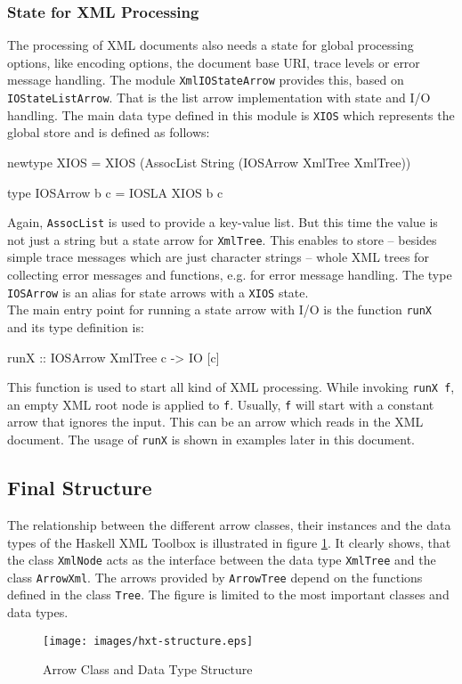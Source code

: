 \documentclass[11pt,a4paper,headsepline, bibtotoc]{scrreprt}
\begin{document}
\subsubsection{State for XML Processing}\label{xmlstate}
The processing of XML documents also needs a state for global processing options, like encoding options, the document base URI, trace levels or error message handling. The module \texttt{XmlIO\-StateArrow} provides this, based on \texttt{IOStateListArrow}. That is the list arrow implementation with state and I/O handling. The main data type defined in this module is \texttt{XIOS} which represents the global store and is defined as follows:
\begin{code}
newtype XIOS 
    = XIOS (AssocList String (IOSArrow XmlTree XmlTree))

type IOSArrow b c = IOSLA XIOS b c
\end{code}
Again, \texttt{AssocList} is used to provide a key-value list. But this time the value is not just a string but a state arrow for \texttt{XmlTree}. This enables to store -- besides simple trace messages which are just character strings -- whole XML trees for collecting error messages and functions, e.g. for error message handling. The type \texttt{IOSArrow} is an alias for state arrows with a \texttt{XIOS} state.\\
The main entry point for running a state arrow with I/O is the function \texttt{runX} and its type definition is:
\begin{code}
runX :: IOSArrow XmlTree c -> IO [c]
\end{code}
This function is used to start all kind of XML processing. While invoking \texttt{runX f}, an empty XML root node is applied to \texttt{f}. Usually, \texttt{f} will start with a constant arrow that ignores the input. This can be an arrow which reads in the XML document. The usage of \texttt{runX} is shown in examples later in this document.

\subsection{Final Structure}
The relationship between the different arrow classes, their instances and the data types of the Haskell XML Toolbox is illustrated in figure \ref{hxt_structure}. It clearly shows, that the class \texttt{XmlNode} acts as the interface between the data type \texttt{XmlTree} and the class \texttt{ArrowXml}. The arrows provided by \texttt{ArrowTree} depend on the functions defined in the class \texttt{Tree}. The figure is limited to the most important classes and data types. 
\begin{figure}[H]
        \caption{Arrow Class and Data Type Structure}
        \label{hxt_structure}
        \texttt{[image: images/hxt-structure.eps]}
\end{figure}
\end{document}

